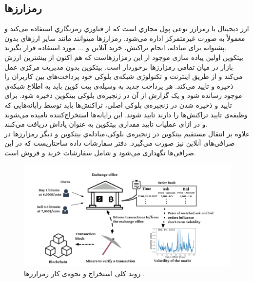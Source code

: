 \subsection{رمزارزها}
ارز دیجیتال یا رمزارز نوعی پول مجازي است که از فناوري رمزنگاري استفاده می‌کند و معمولاً به صورت غیرمتمرکز اداره می‌شود. رمزارزها میتوانند مانند سایر ارزهاي بدون پشتوانه برای مبادله، انجام تراکنش، خرید آنلاین و ... مورد استفاده قرار بگیرند.\\
بیتکوین اولین پیاده سازی موجود از این رمزارز‌هاست که هم اکنون از بیشترین ارزش بازار در میان تمامی رمزارزها برخوردار است\cite{nakamoto2008bitcoin}. بیتکوین بدون مدیریت مرکزی عمل می‌کند و از طریق اینترنت و تکنولوژی شبکه‌ی بلوکی خود پرداخت‌های بین کاربران را ذخیره و تایید می‌کند. هر پرداخت جدید به وسیله‌ی بیت کوین باید به اطلاع شبکه‌ی موجود رسانده شود و یک گزارش از آن در زنجیره‌ی بلوکی بیتکوین ذخیره شود. برای تایید و ذخیره شدن در زنجیره‌ی بلوکی اصلی، تراکنش‌ها باید توسط رایانه‌هایی که وظیفه‌ی تایید تراکنش‌ها را دارند تایید شوند. این رایانه‌ها استخراج‌کننده نامیده می‌شوند و در ازای عملیات تایید مقداری بیتکوین به عنوان پاداش دریافت می‌کنند.\\
علاوه بر انتقال مستقیم بیتکوین در زنجیره‌ی بلوکی،‌مبادله‌ي بیتکوین و دیگر رمزارزها در صرافی‌های آنلاین نیز صورت می‌گیرد. دفتر سفارشات داده ساختاریست که در این صرافی‌ها نگهداری می‌شود و شامل سفارشات خرید و فروش است\cite{naes2006order}.
\begin{figure}[!t]
	\includegraphics[width=0.6 \textwidth]{images/mine}
	\centering
	\caption{روند کلی استخراج و نحوه‌ی کار رمز‌ارزها \cite{guo2018bitcoin}.
	}
	\label{fig.panjda}
\end{figure}

